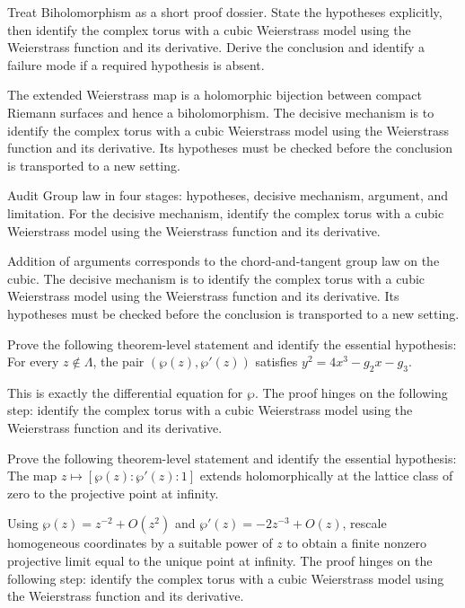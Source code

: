 \begin{problem}\label{prob:iv31-problem-06}
Treat Biholomorphism as a short proof dossier. State the hypotheses explicitly, then identify the complex torus with a cubic Weierstrass model using the Weierstrass function and its derivative. Derive the conclusion and identify a failure mode if a required hypothesis is absent.
\end{problem}
\begin{solution}
The extended Weierstrass map is a holomorphic bijection between compact Riemann surfaces and hence a biholomorphism. The decisive mechanism is to identify the complex torus with a cubic Weierstrass model using the Weierstrass function and its derivative. Its hypotheses must be checked before the conclusion is transported to a new setting.
\end{solution}

\begin{problem}\label{prob:iv31-problem-07}
Audit Group law in four stages: hypotheses, decisive mechanism, argument, and limitation. For the decisive mechanism, identify the complex torus with a cubic Weierstrass model using the Weierstrass function and its derivative.
\end{problem}
\begin{solution}
Addition of arguments corresponds to the chord-and-tangent group law on the cubic. The decisive mechanism is to identify the complex torus with a cubic Weierstrass model using the Weierstrass function and its derivative. Its hypotheses must be checked before the conclusion is transported to a new setting.
\end{solution}

\begin{problem}\label{prob:iv31-problem-08}
Prove the following theorem-level statement and identify the essential hypothesis: For every $z\notin\Lambda$, the pair $(\wp(z),\wp'(z))$ satisfies $y^2=4x^3-g_2x-g_3$.
\end{problem}
\begin{solution}
This is exactly the differential equation for $\wp$. The proof hinges on the following step: identify the complex torus with a cubic Weierstrass model using the Weierstrass function and its derivative.
\end{solution}

\begin{problem}\label{prob:iv31-problem-09}
Prove the following theorem-level statement and identify the essential hypothesis: The map $z\mapsto[\wp(z):\wp'(z):1]$ extends holomorphically at the lattice class of zero to the projective point at infinity.
\end{problem}
\begin{solution}
Using $\wp(z)=z^{-2}+O(z^2)$ and $\wp'(z)=-2z^{-3}+O(z)$, rescale homogeneous coordinates by a suitable power of $z$ to obtain a finite nonzero projective limit equal to the unique point at infinity. The proof hinges on the following step: identify the complex torus with a cubic Weierstrass model using the Weierstrass function and its derivative.
\end{solution}

